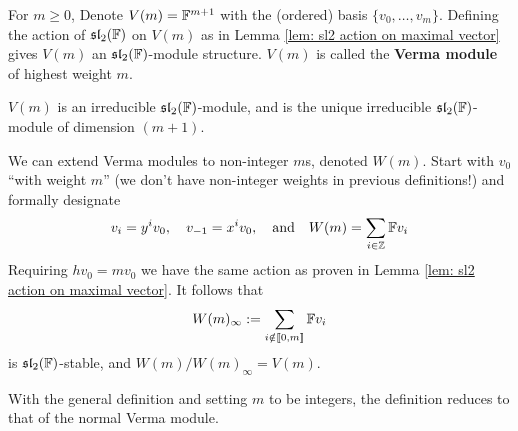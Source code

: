 \documentclass{article}
\begin{document}
\begin{definition}
    For $m \geq 0$, Denote $V(m) = \mathbb{F}^{m+1}$ with the (ordered) basis $\{ v_0, \dots, v_m \}$. Defining the action of $\mathfrak{sl}_2(\mathbb{F})$ on $V(m)$ as in Lemma \ref{lem: sl2 action on maximal vector} gives $V(m)$ an $\mathfrak{sl}_2(\mathbb{F})$-module structure. $V(m)$ is called the \textbf{Verma module} of highest weight $m$.
\end{definition}
\nogap
\begin{remark}
    $V(m)$ is an irreducible $\mathfrak{sl}_2(\mathbb{F})$-module, and is the unique irreducible $\mathfrak{sl}_2(\mathbb{F})$-module of dimension $(m+1)$.
\end{remark}

\begin{remark}
    We can extend Verma modules to non-integer $m$s, denoted $W(m)$. Start with $v_0$ ``with weight $m$'' (we don't have non-integer weights in previous definitions!) and formally designate
    \[
        v_i = y^i v_0, \quad v_{-1} = x^i v_0, \quad \text{and} \quad W(m) = \sum_{i \in \mathbb{Z}} \mathbb{F} v_i
    \]
    Requiring $h v_0 = m v_0$ we have the same action as proven in Lemma \ref{lem: sl2 action on maximal vector}. It follows that 
    \[
        W(m)_{\infty} := \sum_{i \notin \llbracket 0, m \rrbracket} \mathbb{F} v_i
    \]
    is $\mathfrak{sl}_2(\mathbb{F})$-stable, and $W(m)/W(m)_{\infty} = V(m)$.

    With the general definition and setting $m$ to be integers, the definition reduces to that of the normal Verma module.
\end{remark}
\end{document}

